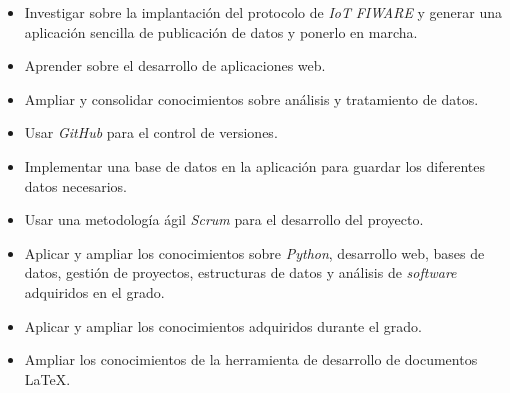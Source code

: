 \begin{itemize}
\tightlist

\item Investigar sobre la implantación del protocolo de \textit{IoT} \textit{FIWARE} y generar una aplicación sencilla de publicación de datos y ponerlo en marcha.
\item Aprender sobre el desarrollo de aplicaciones web.
\item Ampliar y consolidar conocimientos sobre análisis y tratamiento de datos.
\item Usar \textit{GitHub} para el control de versiones.
\item Implementar una base de datos en la aplicación para guardar los diferentes datos necesarios.
\item Usar una metodología ágil \textit{Scrum} para el desarrollo del proyecto.
\item Aplicar y ampliar los conocimientos sobre \textit{Python}, desarrollo web, bases de datos, gestión de proyectos, estructuras de datos y análisis de \textit{software} adquiridos en el grado.
\item Aplicar y ampliar los conocimientos adquiridos durante el grado.
\item Ampliar los conocimientos de la herramienta de desarrollo de documentos \LaTeX{}.


\end{itemize}